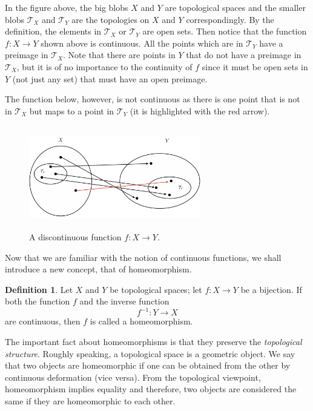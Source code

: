 \documentclass[12pt]{article}
\newcommand{\topology}{\mathcal{T}}                       %
\theoremstyle{definition}
\newtheorem*{definition}{Definition}
\begin{document}
In the figure above, the big blobs $X$ and $Y$ are topological spaces and the smaller blobs $\topology_X$
and $\topology_Y$ are the topologies on $X$ and $Y$ correspondingly. By the definition, the elements in $\topology_X$
or $\topology_Y$ are open sets. Then notice that the function $f : X \to Y$ shown above is continuous. All the points
which are in $\topology_Y$ have a preimage in $\topology_X$. Note that there are points in $Y$ that do not have a preimage
in $\topology_X$, but it is of no importance to the continuity of $f$ since it must be open sets in $Y$ (not just any set)
that must have an open preimage.

\bigskip

The function below, however, is not continuous as there is one point that is not in $\topology_X$
but maps to a point in $\topology_Y$ (it is highlighted with the red arrow).

\begin{figure}[H]
    \centering
    \includegraphics[width=7.5cm, height=4.5cm]{discontinuous-function}
    \caption*{A discontinuous function $f : X \to Y$.}
\end{figure}

\bigskip

Now that we are familiar with the notion of continuous functions, we shall introduce a new concept, that of homeomorphism.

\begin{definition}
\cite{7} Let $X$ and $Y$ be topological spaces; let $f : X \to Y$ be a bijection. If both the function $f$
and the inverse function
$$f^{-1} : Y \to X$$
are continuous, then $f$ is called a homeomorphism.
\end{definition}

The important fact about homeomorphisms is that they preserve the \textit{topological structure}.
Roughly speaking, a topological space is a geometric object. We say that two objects are homeomorphic
if one can be obtained from the other by continuous deformation (vice versa). From the topological viewpoint,
homeomorphism implies equality and therefore, two objects are considered the same if they are homeomorphic
to each other.
\end{document}
